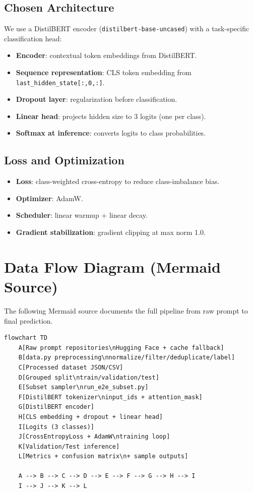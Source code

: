 \documentclass[11pt]{article}
\begin{document}
\subsection{Chosen Architecture}
We use a DistilBERT encoder (\texttt{distilbert-base-uncased}) with a task-specific classification head:
\begin{itemize}[leftmargin=*]
\item \textbf{Encoder}: contextual token embeddings from DistilBERT.
\item \textbf{Sequence representation}: CLS token embedding from \texttt{last\_hidden\_state[:,0,:]}.
\item \textbf{Dropout layer}: regularization before classification.
\item \textbf{Linear head}: projects hidden size to 3 logits (one per class).
\item \textbf{Softmax at inference}: converts logits to class probabilities.
\end{itemize}

\subsection{Loss and Optimization}
\begin{itemize}[leftmargin=*]
\item \textbf{Loss}: class-weighted cross-entropy to reduce class-imbalance bias.
\item \textbf{Optimizer}: AdamW.
\item \textbf{Scheduler}: linear warmup + linear decay.
\item \textbf{Gradient stabilization}: gradient clipping at max norm 1.0.
\end{itemize}

\section{Data Flow Diagram (Mermaid Source)}
The following Mermaid source documents the full pipeline from raw prompt to final prediction.

\begin{verbatim}
flowchart TD
    A[Raw prompt repositories\nHugging Face + cache fallback]
    B[data.py preprocessing\nnormalize/filter/deduplicate/label]
    C[Processed dataset JSON/CSV]
    D[Grouped split\ntrain/validation/test]
    E[Subset sampler\nrun_e2e_subset.py]
    F[DistilBERT tokenizer\ninput_ids + attention_mask]
    G[DistilBERT encoder]
    H[CLS embedding + dropout + linear head]
    I[Logits (3 classes)]
    J[CrossEntropyLoss + AdamW\ntraining loop]
    K[Validation/Test inference]
    L[Metrics + confusion matrix\n+ sample outputs]

    A --> B --> C --> D --> E --> F --> G --> H --> I
    I --> J --> K --> L
\end{verbatim}
\end{document}
